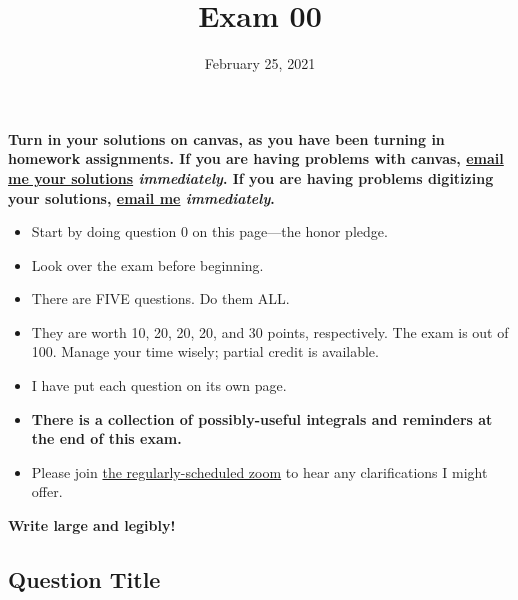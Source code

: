 
\providecommand{\repositoryInformationSetup}{} %
\repositoryInformationSetup


\pointsinleftmargin 
{}
\extrawidth{-0.5in}


\title{Exam 00}
\contact
\date{February 25, 2021}

\maketitle

{\bf Turn in your solutions on canvas, as you have been turning in homework assignments.  If you are having problems with canvas, \href{mailto:evanb@umd.edu}{email me your solutions} \emph{immediately}.  If you are having problems digitizing your solutions, \href{mailto:evanb@umd.edu}{email me} \emph{immediately}.}

\begin{itemize}
	\item	Start by doing question 0 on this page---the honor pledge.
	\item	Look over the exam before beginning.
	\item	There are FIVE questions.  Do them ALL.
	\item	They are worth 10, 20, 20, 20, and 30 points, respectively.  The exam is out of 100.  Manage your time wisely; partial credit is available.
	\item	I have put each question on its own page.  
	\item	{\bf There is a collection of possibly-useful integrals and reminders at the end of this exam.}
	\item	Please join \href{https://umd.zoom.us/j/96037839765?pwd=c0FYMEVteHlKbkJNSU1JUko3RHZ5QT09}{the regularly-scheduled zoom} to hear any clarifications I might offer.
\end{itemize}

{\bf Write large and legibly!}


\begin{questions}
	\clearpage
	\section*{Question Title}
	
\end{questions}

\ifprintanswers
\else
	\clearpage
	
\fi

